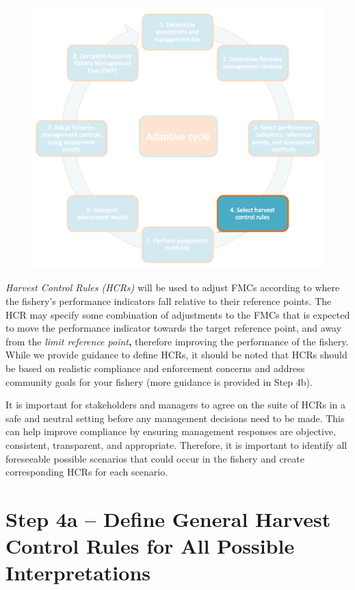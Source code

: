 \documentclass[]{book}
\begin{document}
\begin{figure}
\centering
\includegraphics{myMediaFolder/media/Step4.png}
\caption{}
\end{figure}

\emph{Harvest Control Rules (HCRs)} will be used to adjust FMCs
according to where the fishery's performance indicators fall relative to
their reference points. The HCR may specify some combination of
adjustments to the FMCs that is expected to move the performance
indicator towards the target reference point, and away from the
\emph{limit reference point}\textbf{,} therefore improving the
performance of the fishery. While we provide guidance to define HCRs, it
should be noted that HCRs should be based on realistic compliance and
enforcement concerns and address community goals for your fishery (more
guidance is provided in Step 4b).

It is important for stakeholders and managers to agree on the suite of
HCRs in a safe and neutral setting before any management decisions need
to be made. This can help improve compliance by ensuring management
responses are objective, consistent, transparent, and appropriate.
Therefore, it is important to identify all foreseeable possible
scenarios that could occur in the fishery and create corresponding HCRs
for each scenario.

\section{Step 4a -- Define General Harvest Control Rules for All
Possible
Interpretations}\label{step-4a-define-general-harvest-control-rules-for-all-possible-interpretations}
\end{document}
